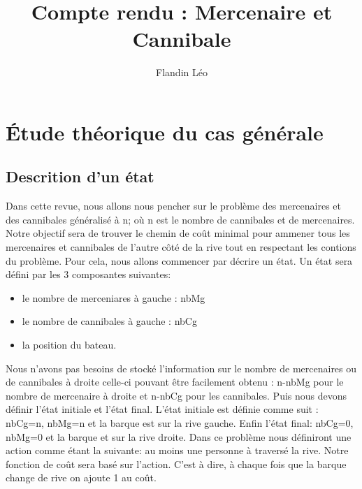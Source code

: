 \documentclass[a4paper, 12pt, french]{book}
\title{Compte rendu : Mercenaire et Cannibale}
\author{Flandin Léo}
\begin{document}
\maketitle
\tableofcontents
\frontmatter


\mainmatter
\chapter{Étude théorique du cas générale}
\section{Descrition d'un état}
Dans cette revue, nous allons nous pencher sur le problème des mercenaires et des cannibales généralisé à n; où n est le nombre de cannibales et de mercenaires. Notre objectif sera de trouver le chemin de coût minimal pour ammener tous les mercenaires et cannibales de l'autre côté de la rive tout en respectant les contions du problème. Pour cela, nous allons commencer par décrire un état. Un état sera défini par les 3 composantes suivantes:
\begin{itemize}
    \item le nombre de merceniares à gauche : nbMg
    \item le nombre de cannibales à gauche : nbCg
    \item la position du bateau.
\end{itemize}
Nous n'avons pas besoins de stocké l'information sur le nombre de mercenaires ou de cannibales à droite celle-ci pouvant être facilement obtenu : n-nbMg pour le nombre de mercenaire à droite et n-nbCg pour les cannibales. Puis nous devons définir l'état initiale et l'état final. L'état initiale est définie comme suit : nbCg=n, nbMg=n et la barque est sur la rive gauche. Enfin l'état final: nbCg=0, nbMg=0 et la barque et sur la rive droite. Dans ce problème nous définiront une action comme étant la suivante: au moins une personne à traversé la rive. Notre fonction de coût sera basé sur l'action. C'est à dire, à chaque fois que la barque change de rive on ajoute 1 au coût.
\end{document}
